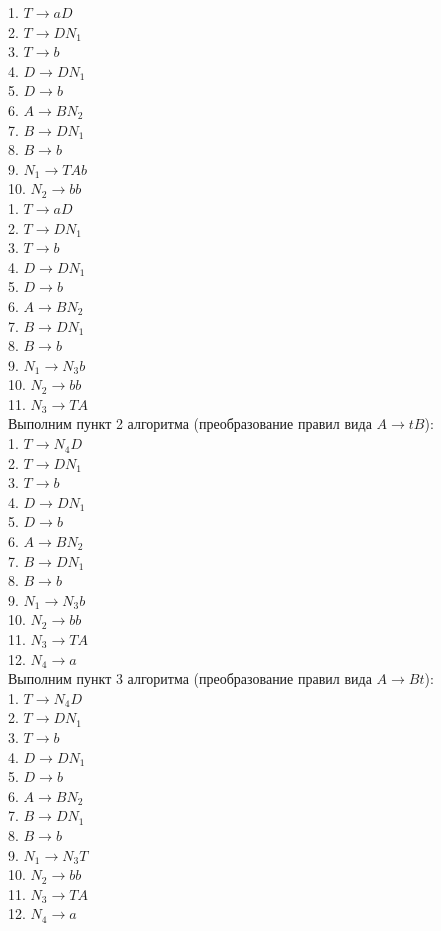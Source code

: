 \documentclass[a4paper,14pt]{extarticle}
\begin{document}
\begin{enumerate}[1.]
1. $T \rightarrow aD$\\
2. $T \rightarrow DN_1$\\
3. $T \rightarrow b$\\
4. $D \rightarrow DN_1$\\
5. $D \rightarrow b$\\
6. $A \rightarrow BN_2$\\
7. $B \rightarrow DN_1$\\
8. $B \rightarrow b$\\
9. $N_1 \rightarrow TAb$\\
10. $N_2 \rightarrow bb$\\

1. $T \rightarrow aD$\\
2. $T \rightarrow DN_1$\\
3. $T \rightarrow b$\\
4. $D \rightarrow DN_1$\\
5. $D \rightarrow b$\\
6. $A \rightarrow BN_2$\\
7. $B \rightarrow DN_1$\\
8. $B \rightarrow b$\\
9. $N_1 \rightarrow N_3b$\\
10. $N_2 \rightarrow bb$\\
11. $N_3 \rightarrow TA$\\

Выполним пункт 2 алгоритма (преобразование правил вида $A \rightarrow tB$):\\
1. $T \rightarrow N_4D$\\
2. $T \rightarrow DN_1$\\
3. $T \rightarrow b$\\
4. $D \rightarrow DN_1$\\
5. $D \rightarrow b$\\
6. $A \rightarrow BN_2$\\
7. $B \rightarrow DN_1$\\
8. $B \rightarrow b$\\
9. $N_1 \rightarrow N_3b$\\
10. $N_2 \rightarrow bb$\\
11. $N_3 \rightarrow TA$\\
12. $N_4 \rightarrow a$\\

Выполним пункт 3 алгоритма (преобразование правил вида $A \rightarrow Bt$):\\
1. $T \rightarrow N_4D$\\
2. $T \rightarrow DN_1$\\
3. $T \rightarrow b$\\
4. $D \rightarrow DN_1$\\
5. $D \rightarrow b$\\
6. $A \rightarrow BN_2$\\
7. $B \rightarrow DN_1$\\
8. $B \rightarrow b$\\
9. $N_1 \rightarrow N_3T$\\
10. $N_2 \rightarrow bb$\\
11. $N_3 \rightarrow TA$\\
12. $N_4 \rightarrow a$\\


\end{enumerate}
\end{document}
